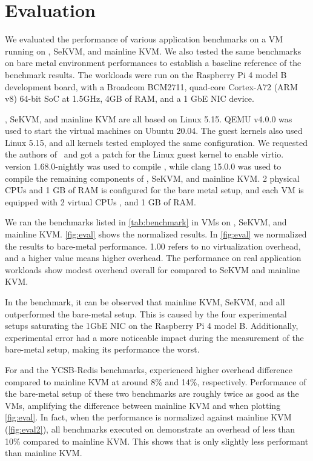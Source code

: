\chapter{Evaluation}
\label{sec:eval}

We evaluated the performance of various application benchmarks
on a VM running on \rustsec{}, SeKVM, and mainline KVM.
We also tested the same
benchmarks on bare metal environment performances to establish a baseline
reference of the benchmark results. The workloads were run on the Raspberry
Pi 4 model B development board, with a Broadcom BCM2711, quad-core
Cortex-A72 (ARM v8) 64-bit SoC at 1.5GHz, 4GB of RAM, and a 1 GbE NIC device.

\rustsec{}, SeKVM, and mainline KVM are all based on Linux 5.15.
QEMU v4.0.0 was used to start the virtual machines on Ubuntu 20.04. The guest
kernels also used Linux 5.15, and all kernels tested employed the same 
configuration. We requested the authors of~\cite{hypsec} and got a patch for
the Linux guest kernel to enable virtio.
 version 1.68.0-nightly was used to compile \rustcore{},
while clang 15.0.0 was used to compile the remaining components of
\rustsec{}, SeKVM, and mainline KVM.
2 physical CPUs and 1 GB of RAM is configured for the bare
metal setup, and each VM is equipped with 2 virtual CPUs , and 1 GB of RAM.

We ran the benchmarks listed in \autoref{tab:benchmark} in VMs on
\rustsec{}, SeKVM, and mainline KVM. \autoref{fig:eval} shows the normalized
results. In \autoref{fig:eval} we normalized the results to bare-metal
performance. 1.00 refers to no virtualization overhead, and
a higher value means higher overhead. The performance on real application
workloads show modest overhead overall for \rustsec{} compared to SeKVM and
mainline KVM.

In the  benchmark, it can be observed that mainline KVM,
SeKVM, and \rustsec{} all outperformed the bare-metal setup. This is caused by
the four experimental setups saturating the 1GbE NIC on the Raspberry Pi 4
model B. Additionally, experimental error had a more noticeable impact during
the measurement of the bare-metal setup, making its performance the worst.

For  and the YCSB-Redis benchmarks, \rustsec{} experienced higher
overhead difference compared to mainline KVM at around 8\% and 14\%,
respectively.
Performance of the bare-metal setup of these two benchmarks
are roughly twice as good as the VMs, amplifying the difference between mainline
KVM and \rustsec{} when plotting \autoref{fig:eval}.
In fact, when the performance is normalized against
mainline KVM (\autoref{fig:eval2}), all benchmarks executed on \rustsec{}
demonstrate an overhead of less than 10\% compared to mainline KVM.
This shows that \rustsec{} is only slightly less performant than mainline KVM.

